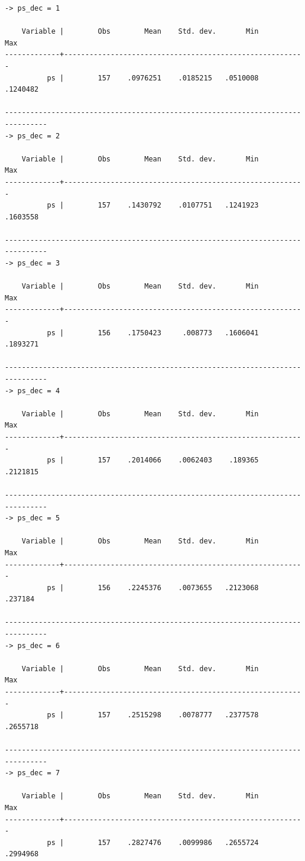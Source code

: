 \documentclass[
  10pt,
]{book}
\begin{document}
\begin{verbatim}
-> ps_dec = 1

    Variable |        Obs        Mean    Std. dev.       Min        Max
-------------+---------------------------------------------------------
          ps |        157    .0976251    .0185215   .0510008   .1240482

--------------------------------------------------------------------------------
-> ps_dec = 2

    Variable |        Obs        Mean    Std. dev.       Min        Max
-------------+---------------------------------------------------------
          ps |        157    .1430792    .0107751   .1241923   .1603558

--------------------------------------------------------------------------------
-> ps_dec = 3

    Variable |        Obs        Mean    Std. dev.       Min        Max
-------------+---------------------------------------------------------
          ps |        156    .1750423     .008773   .1606041   .1893271

--------------------------------------------------------------------------------
-> ps_dec = 4

    Variable |        Obs        Mean    Std. dev.       Min        Max
-------------+---------------------------------------------------------
          ps |        157    .2014066    .0062403    .189365   .2121815

--------------------------------------------------------------------------------
-> ps_dec = 5

    Variable |        Obs        Mean    Std. dev.       Min        Max
-------------+---------------------------------------------------------
          ps |        156    .2245376    .0073655   .2123068    .237184

--------------------------------------------------------------------------------
-> ps_dec = 6

    Variable |        Obs        Mean    Std. dev.       Min        Max
-------------+---------------------------------------------------------
          ps |        157    .2515298    .0078777   .2377578   .2655718

--------------------------------------------------------------------------------
-> ps_dec = 7

    Variable |        Obs        Mean    Std. dev.       Min        Max
-------------+---------------------------------------------------------
          ps |        157    .2827476    .0099986   .2655724   .2994968


\end{verbatim}
\end{document}
